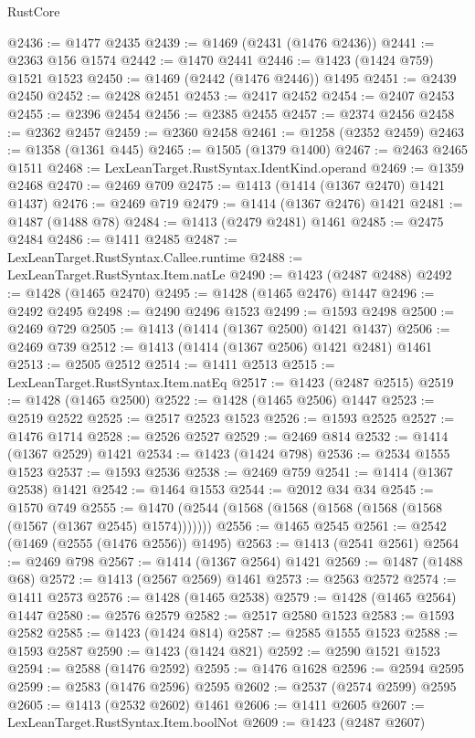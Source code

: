 \begin{lexlean}{RustCore}
\begin{coremodule}
{\begin{coremodule}
{{{{{{{{{{{{{{{{{{{{{{{{{{{{{{{{{{{{{{{{{{{{{{{@2436 := @1477 @2435
@2439 := @1469 (@2431 (@1476 @2436))
@2441 := @2363 @156 @1574
@2442 := @1470 @2441
@2446 := @1423 (@1424 @759) @1521 @1523
@2450 := @1469 (@2442 (@1476 @2446)) @1495
@2451 := @2439 @2450
@2452 := @2428 @2451
@2453 := @2417 @2452
@2454 := @2407 @2453
@2455 := @2396 @2454
@2456 := @2385 @2455
@2457 := @2374 @2456
@2458 := @2362 @2457
@2459 := @2360 @2458
@2461 := @1258 (@2352 @2459)
@2463 := @1358 (@1361 @445)
@2465 := @1505 (@1379 @1400)
@2467 := @2463 @2465 @1511
@2468 := LexLeanTarget.RustSyntax.IdentKind.operand
@2469 := @1359 @2468
@2470 := @2469 @709
@2475 := @1413 (@1414 (@1367 @2470) @1421 @1437)
@2476 := @2469 @719
@2479 := @1414 (@1367 @2476) @1421
@2481 := @1487 (@1488 @78)
@2484 := @1413 (@2479 @2481) @1461
@2485 := @2475 @2484
@2486 := @1411 @2485
@2487 := LexLeanTarget.RustSyntax.Callee.runtime
@2488 := LexLeanTarget.RustSyntax.Item.natLe
@2490 := @1423 (@2487 @2488)
@2492 := @1428 (@1465 @2470)
@2495 := @1428 (@1465 @2476) @1447
@2496 := @2492 @2495
@2498 := @2490 @2496 @1523
@2499 := @1593 @2498
@2500 := @2469 @729
@2505 := @1413 (@1414 (@1367 @2500) @1421 @1437)
@2506 := @2469 @739
@2512 := @1413 (@1414 (@1367 @2506) @1421 @2481) @1461
@2513 := @2505 @2512
@2514 := @1411 @2513
@2515 := LexLeanTarget.RustSyntax.Item.natEq
@2517 := @1423 (@2487 @2515)
@2519 := @1428 (@1465 @2500)
@2522 := @1428 (@1465 @2506) @1447
@2523 := @2519 @2522
@2525 := @2517 @2523 @1523
@2526 := @1593 @2525
@2527 := @1476 @1714
@2528 := @2526 @2527
@2529 := @2469 @814
@2532 := @1414 (@1367 @2529) @1421
@2534 := @1423 (@1424 @798)
@2536 := @2534 @1555 @1523
@2537 := @1593 @2536
@2538 := @2469 @759
@2541 := @1414 (@1367 @2538) @1421
@2542 := @1464 @1553
@2544 := @2012 @34 @34
@2545 := @1570 @749
@2555 := @1470 (@2544 (@1568 (@1568 (@1568 (@1568 (@1568 (@1567 (@1367 @2545) @1574)))))))
@2556 := @1465 @2545
@2561 := @2542 (@1469 (@2555 (@1476 @2556)) @1495)
@2563 := @1413 (@2541 @2561)
@2564 := @2469 @798
@2567 := @1414 (@1367 @2564) @1421
@2569 := @1487 (@1488 @68)
@2572 := @1413 (@2567 @2569) @1461
@2573 := @2563 @2572
@2574 := @1411 @2573
@2576 := @1428 (@1465 @2538)
@2579 := @1428 (@1465 @2564) @1447
@2580 := @2576 @2579
@2582 := @2517 @2580 @1523
@2583 := @1593 @2582
@2585 := @1423 (@1424 @814)
@2587 := @2585 @1555 @1523
@2588 := @1593 @2587
@2590 := @1423 (@1424 @821)
@2592 := @2590 @1521 @1523
@2594 := @2588 (@1476 @2592)
@2595 := @1476 @1628
@2596 := @2594 @2595
@2599 := @2583 (@1476 @2596) @2595
@2602 := @2537 (@2574 @2599) @2595
@2605 := @1413 (@2532 @2602) @1461
@2606 := @1411 @2605
@2607 := LexLeanTarget.RustSyntax.Item.boolNot
@2609 := @1423 (@2487 @2607)
}}}}}}}}}}}}}}}}}}}}}}}}}}}}}}}}}}}}}}}}}}}}}}}
\end{coremodule}}
\end{coremodule}
\end{lexlean}

